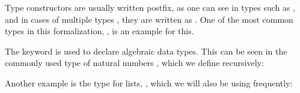 \begin{isabellebody}
\begin{isamarkuptext}
Type constructors are usually written postfix, as one can see in types such as
, and in cases of multiple types , they are written as 
\mbox{}. One of the most common types in this formalization, , 
is an example for this.

The keyword  is used to declare algebraic data types. This can be seen in the 
commonly used type of natural numbers , which we define recursively:
\begin{quote}
\end{quote}
Another example is the type for lists, , which we will also be using frequently:
\begin{quote}
\end{quote}


\end{isamarkuptext}
\end{isabellebody}
